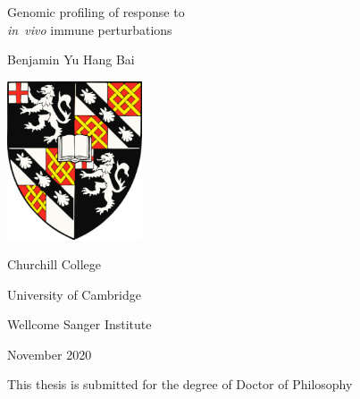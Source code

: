 %


\begin{titlepage}
    \begin{center}
            
        \null

        \Huge
        Genomic profiling of response to\\
        \textit{in~vivo} immune perturbations

        \vspace{1em}
            
        \Large
        Benjamin Yu Hang Bai

        \vspace{2em}
            
        \includegraphics[width=0.3\textwidth]{frontmatter/figures/Churchill_College_Crest.pdf}

        \vspace{1em}
            
        Churchill College

        University of Cambridge

        Wellcome Sanger Institute

        \vspace{1em}

        November 2020

        \vspace{1em}

        \normalsize
        This thesis is submitted for the degree of Doctor of Philosophy

        \null
            
    \end{center}
\end{titlepage}
